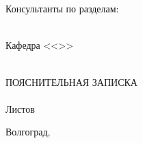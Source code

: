 {    \hfill
    \\\\
    Консультанты по разделам:\\
    \hfill
    \hfill
    \\
    \clearpage
    \renewcommand{\VSTUDocumentCodeSuffix}{81}
    \addtocounter{page}{-1}
    \begin{center}
    \VSTUTitleHeading
    Кафедра <<\VSTUDepartment>>\\
    \end{center}
    \vfill
    \hfill\VSTUTitleHeadApproval
    \vspace{8mm}
    \begin{center}
    \VSTUTitle\\
    \vspace{\fill}
    ПОЯСНИТЕЛЬНАЯ ЗАПИСКА\\
    \vspace{8mm}
    \VSTUDocumentCode\\
    \vspace{8mm}
    Листов \totalpages\\
    \vspace{\fill}
    \end{center}
    \begin{flushright}
    \VSTUTitleDirector
    \end{flushright}
    \vspace{8mm}
    \begin{flushleft}
    \VSTUTitleStandardsAdviser
    \hfill
    \VSTUTitleImplementer
    \end{flushleft}
    \vspace{\fill}
    \begin{center}
    Волгоград,~\the\year
    \end{center}
    \clearpage
    \pagestyle{plainhf}
}
